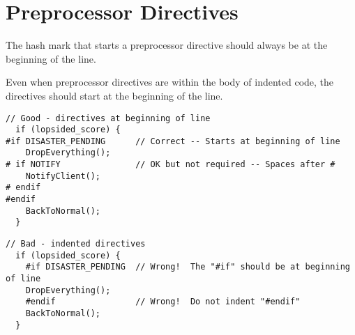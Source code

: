 
\section{Preprocessor Directives}\label{sec:preprocessor-directives}
The hash mark that starts a preprocessor directive should always be at the beginning of the line.

Even when preprocessor directives are within the body of indented code, the directives should start at the beginning of the line.
\begin{verbatim}
// Good - directives at beginning of line
  if (lopsided_score) {
#if DISASTER_PENDING      // Correct -- Starts at beginning of line
    DropEverything();
# if NOTIFY               // OK but not required -- Spaces after #
    NotifyClient();
# endif
#endif
    BackToNormal();
  }
\end{verbatim}
\begin{verbatim}
// Bad - indented directives
  if (lopsided_score) {
    #if DISASTER_PENDING  // Wrong!  The "#if" should be at beginning of line
    DropEverything();
    #endif                // Wrong!  Do not indent "#endif"
    BackToNormal();
  }
\end{verbatim}
